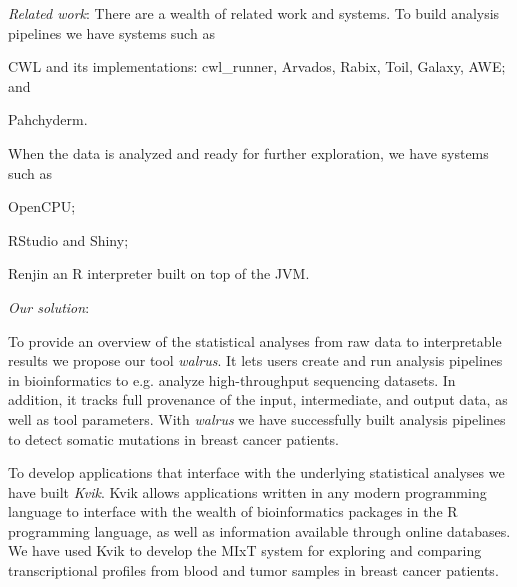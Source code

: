 
\emph{Related work}:
% 
There are a wealth of related work and systems. To build analysis pipelines we
have systems such as
\begin{enumerate*}[label=(\roman*)]
    \item CWL and its implementations: cwl\_runner, Arvados, Rabix, Toil, Galaxy,
        AWE; and 
    \item Pahchyderm. 
\end{enumerate*}
When the data is analyzed and ready for further exploration, we have systems
such as
\begin{enumerate*}[label=(\roman*)]
    \item OpenCPU;
    \item RStudio and Shiny; 
    \item Renjin an R interpreter built on top of the JVM. 
\end{enumerate*}
 

\emph{Our solution}: 

To provide an overview of the statistical analyses from raw data to
interpretable results we propose our tool \emph{walrus}. It lets users create
and run analysis pipelines in bioinformatics to e.g. analyze high-throughput
sequencing datasets. In addition, it tracks full provenance of the input,
intermediate, and output data, as well as tool parameters. With \emph{walrus} we
have successfully built analysis pipelines to detect somatic mutations in breast
cancer patients. 

To develop applications that interface with the underlying statistical analyses
we have built \emph{Kvik}. Kvik allows applications written in any modern
programming language to interface with the wealth of bioinformatics packages in
the R programming language, as well as information available through online
databases. We have used Kvik to develop the MIxT system for exploring and
comparing transcriptional profiles from blood and tumor samples in breast cancer
patients. 

